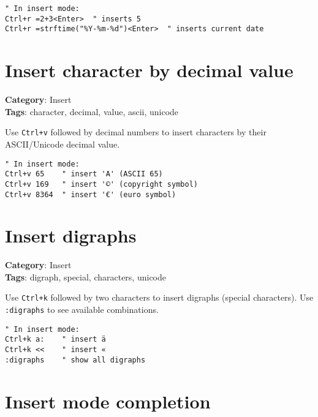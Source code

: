 {{{{{{\begin{Exa*}{}
\begin{Verbatim}[fontsize=\footnotesize, breaklines, breakanywhere]
" In insert mode:
Ctrl+r =2+3<Enter>  " inserts 5
Ctrl+r =strftime("%Y-%m-%d")<Enter>  " inserts current date
\end{Verbatim}
\end{Exa*}

\section{Insert character by decimal value}

\textbf{Category}: Insert\\ \textbf{Tags}: character, decimal, value, ascii, unicode
\vspace{0.5cm}

Use {\footnotesize \Verb§Ctrl+v§} followed by decimal numbers to insert characters by their ASCII/Unicode decimal value.

\begin{Exa*}{}
\begin{Verbatim}[fontsize=\footnotesize, breaklines, breakanywhere]
" In insert mode:
Ctrl+v 65    " insert 'A' (ASCII 65)
Ctrl+v 169   " insert '©' (copyright symbol)
Ctrl+v 8364  " insert '€' (euro symbol)
\end{Verbatim}
\end{Exa*}

\section{Insert digraphs}

\textbf{Category}: Insert\\ \textbf{Tags}: digraph, special, characters, unicode
\vspace{0.5cm}

Use {\footnotesize \Verb§Ctrl+k§} followed by two characters to insert digraphs (special characters). Use {\footnotesize \Verb§:digraphs§} to see available combinations.

\begin{Exa*}{}
\begin{Verbatim}[fontsize=\footnotesize, breaklines, breakanywhere]
" In insert mode:
Ctrl+k a:    " insert ä
Ctrl+k <<    " insert «
:digraphs    " show all digraphs
\end{Verbatim}
\end{Exa*}

\section{Insert mode completion}

}}}}}}
